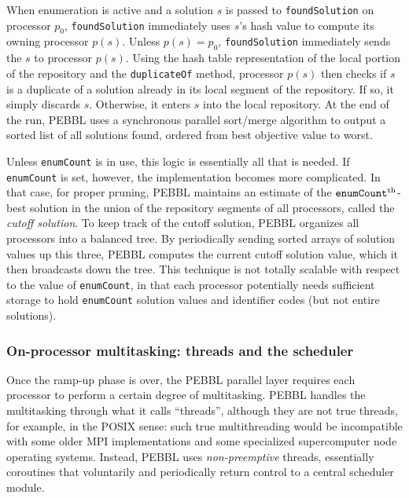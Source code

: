 When enumeration is active and a solution $s$ is passed to
\texttt{foundSolution} on processor $p_0$, \texttt{foundSolution}
immediately uses $s$'s hash value to compute its owning processor
$p(s)$.  Unless $p(s)=p_0$, \texttt{foundSolution} immediately sends
the $s$ to processor $p(s)$.  Using the hash table representation of
the local portion of the repository and the \texttt{duplicateOf}
method, processor $p(s)$ then checks if $s$ is a duplicate of a
solution already in its local segment of the repository.  If so, it
simply discards $s$.  Otherwise, it enters $s$ into the local
repository.  At the end of the run, PEBBL uses a synchronous parallel
sort/merge algorithm to output a sorted list of all solutions found,
ordered from best objective value to worst.

Unless \texttt{enumCount} is in use, this logic is essentially all
that is needed.  If \texttt{enumCount} is set, however, the
implementation becomes more complicated.  In that case, for proper
pruning, PEBBL maintains an estimate of the
$\text{\texttt{enumCount}}^{\text{th}}$-best solution in the union of
the repository segments of all processors, called the
\emph{cutoff solution}.  To keep track of the cutoff solution, PEBBL
organizes all processors into a balanced tree.  By periodically
sending sorted arrays of solution values up this three, PEBBL computes
the current cutoff solution value, which it then broadcasts down the
tree.  This technique is not totally scalable with respect to the
value of \texttt{enumCount}, in that each processor potentially needs
sufficient storage to hold \texttt{enumCount} solution values and
identifier codes (but not entire solutions).


\subsubsection{On-processor multitasking: threads and the scheduler}

Once the ramp-up phase is over, the PEBBL parallel layer requires each
processor to perform a certain degree of multitasking.  PEBBL handles
the multitasking through what it calls ``threads'', although they are
not true threads, for example, in the POSIX sense: such true
multithreading would be incompatible with some older MPI
implementations and some specialized supercomputer node operating
systems.  Instead, PEBBL uses \emph{non-preemptive} threads,
essentially coroutines that voluntarily and periodically return
control to a central scheduler module.

